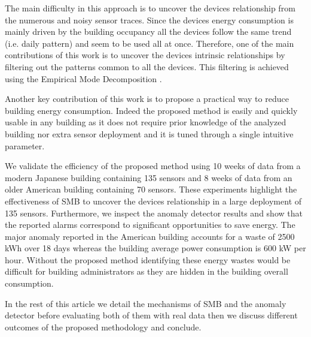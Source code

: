 The main difficulty in this approach is to uncover the devices relationship from the numerous and noisy sensor traces. 
Since the devices energy consumption is mainly driven by the building occupancy all the devices follow the same trend (i.e. daily pattern) and seem to be used all at once.
Therefore, one of the main contributions of this work is to uncover the devices intrinsic relationships by filtering out the patterns common to all the devices.
This filtering is achieved using the Empirical Mode Decomposition \cite{huang:emd1998}.

Another key contribution of this work is to propose a practical way to reduce building energy consumption.
Indeed the proposed method is easily and quickly usable in any building as it does not require prior knowledge of the analyzed building nor extra sensor deployment and it is tuned through a single intuitive parameter.

We validate the efficiency of the proposed method using 10 weeks of data from a modern Japanese building containing 135 sensors and 8 weeks of data from an older American building containing 70 sensors.
These experiments highlight the effectiveness of SMB to uncover the devices relationship in a large deployment of 135 sensors.
Furthermore, we inspect the anomaly detector results and show that the reported alarms correspond to significant opportunities to save energy.
The major anomaly reported in the American building accounts for a waste of 2500 kWh over 18 days whereas the building average power consumption is 600 kW per hour.
Without the proposed method identifying these energy wastes would be difficult for building administrators as they are hidden in the building overall consumption.

In the rest of this article we detail the mechanisms of SMB and the anomaly detector before evaluating both of them with real data then we discuss different outcomes of the proposed methodology and conclude.
